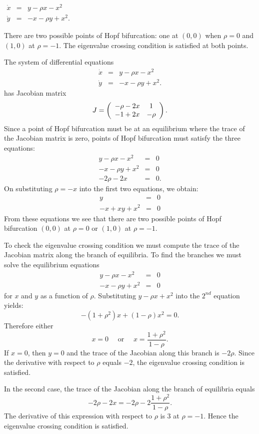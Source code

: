 \documentclass{ximera}
\begin{document}
\begin{exercise} \label{c9.6.1b}
$\begin{array}{rcl}
\dot{x} & = & y - \rho x - x^2   \\
\dot{y} & = & -x - \rho y + x^2.
\end{array}$

\begin{solution}

\ans  There are two possible points of Hopf bifurcation: one at $(0,0)$ 
when $\rho=0$ and $(1,0)$ at $\rho=-1$.  The eigenvalue crossing condition is
satisfied at both points.

\soln  The system of differential equations
\[
\begin{array}{rcl}
\dot{x} & = & y - \rho x - x^2   \\
\dot{y} & = & -x - \rho y + x^2.
\end{array}
\]
has Jacobian matrix 
\[
J = \left(\begin{array}{cc} -\rho-2x & 1\\ -1+2x &-\rho\end{array}\right).
\]
Since a point of Hopf bifurcation must be at an equilibrium where the trace
of the Jacobian matrix is zero, points of Hopf bifurcation must satisfy the
three equations:
\begin{eqnarray*}
y - \rho x - x^2 & = & 0\\
-x - \rho y + x^2 & = & 0\\
-2\rho-2x & = & 0.
\end{eqnarray*}
On substituting $\rho = -x$ into the first two equations, we obtain:
\begin{eqnarray*}
y  & = & 0\\
-x + xy + x^2 & = & 0
\end{eqnarray*}
From these equations we see that there are two possible points of Hopf
bifurcation $(0,0)$ at $\rho=0$ or $(1,0)$ at $\rho=-1$.  

To check the eigenvalue crossing condition we must compute the trace of the
Jacobian matrix along the branch of equilibria.  To find the branches we must
solve the equilibrium equations
\begin{eqnarray*}
y - \rho x - x^2 & = & 0\\
-x - \rho y + x^2 & = & 0
\end{eqnarray*}
for $x$ and $y$ as a function of $\rho$.  Substituting $y - \rho x+x^2$ into
the $2^{nd}$ equation yields:
\[
-(1+\rho^2)x + (1-\rho)x^2 = 0.
\]
Therefore either 
\[
x= 0 \quad \mbox{ or } \quad  x = \frac{1+\rho^2}{1-\rho}.
\]
If $x=0$, then $y=0$ and the trace of the Jacobian along this branch is
$-2\rho$.  Since the derivative with respect to $\rho$ equals $-2$, the
eigenvalue crossing condition is satisfied.

In the second case, the trace of the Jacobian along the branch of equilibria
equals
\[
-2\rho-2x = -2\rho -2\frac{1+\rho^2}{1-\rho}.
\]
The derivative of this expression with respect to $\rho$ is $3$ at $\rho=-1$.
Hence the eigenvalue crossing condition is satisfied.




\end{solution}
\end{exercise}
\end{document}

